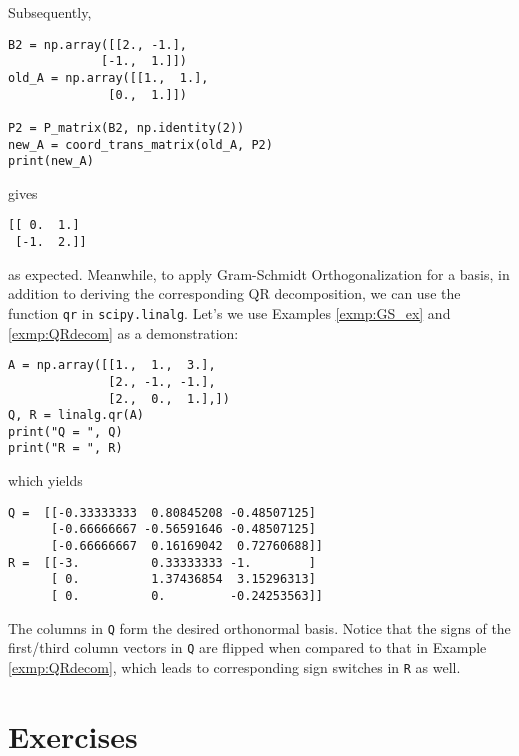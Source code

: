Subsequently,
\begin{lstlisting}
B2 = np.array([[2., -1.], 
             [-1.,  1.]])
old_A = np.array([[1.,  1.], 
              [0.,  1.]])

P2 = P_matrix(B2, np.identity(2))
new_A = coord_trans_matrix(old_A, P2)
print(new_A)
\end{lstlisting}
gives
\begin{lstlisting}
[[ 0.  1.]
 [-1.  2.]]    
\end{lstlisting}
as expected. Meanwhile, to apply Gram-Schmidt Orthogonalization for a basis, in addition to deriving the corresponding QR decomposition, we can use the function \verb|qr| in \verb|scipy.linalg|. Let's we use Examples \ref{exmp:GS_ex} and \ref{exmp:QRdecom} as a demonstration:
\begin{lstlisting}
A = np.array([[1.,  1.,  3.],
              [2., -1., -1.],
              [2.,  0.,  1.],])
Q, R = linalg.qr(A)
print("Q = ", Q)
print("R = ", R)
\end{lstlisting}
which yields
\begin{lstlisting}
Q =  [[-0.33333333  0.80845208 -0.48507125]
      [-0.66666667 -0.56591646 -0.48507125]
      [-0.66666667  0.16169042  0.72760688]]
R =  [[-3.          0.33333333 -1.        ]
      [ 0.          1.37436854  3.15296313]
      [ 0.          0.         -0.24253563]]
\end{lstlisting}
The columns in \verb|Q| form the desired orthonormal basis. Notice that the signs of the first/third column vectors in \verb|Q| are flipped when compared to that in Example \ref{exmp:QRdecom}, which leads to corresponding sign switches in \verb|R| as well.

\section{Exercises}

